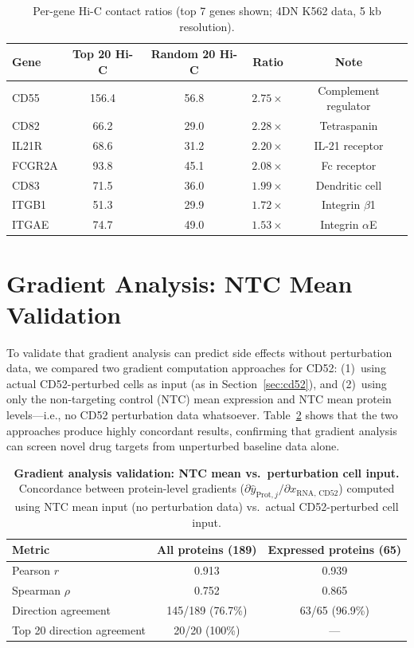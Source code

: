 \documentclass{article}
\begin{document}
\begin{table}[H]
\centering
\small
\caption{Per-gene Hi-C contact ratios (top 7 genes shown; 4DN K562 data, 5 kb resolution).}
\begin{tabular}{lcccc}
\toprule
Gene & Top 20 Hi-C & Random 20 Hi-C & Ratio & Note \\
\midrule
CD55 & 156.4 & 56.8 & $2.75\times$ & Complement regulator \\
CD82 & 66.2 & 29.0 & $2.28\times$ & Tetraspanin \\
IL21R & 68.6 & 31.2 & $2.20\times$ & IL-21 receptor \\
FCGR2A & 93.8 & 45.1 & $2.08\times$ & Fc receptor \\
CD83 & 71.5 & 36.0 & $1.99\times$ & Dendritic cell \\
ITGB1 & 51.3 & 29.9 & $1.72\times$ & Integrin $\beta$1 \\
ITGAE & 74.7 & 49.0 & $1.53\times$ & Integrin $\alpha$E \\
\bottomrule
\end{tabular}
\label{tab:hic_full}
\end{table}

\section{Gradient Analysis: NTC Mean Validation}
\label{app:ntc_gradient}

To validate that gradient analysis can predict side effects without perturbation data, we compared two gradient computation approaches for CD52: (1)~using actual CD52-perturbed cells as input (as in Section~\ref{sec:cd52}), and (2)~using only the non-targeting control (NTC) mean expression and NTC mean protein levels---i.e., no CD52 perturbation data whatsoever. Table~\ref{tab:ntc_validation} shows that the two approaches produce highly concordant results, confirming that gradient analysis can screen novel drug targets from unperturbed baseline data alone.

\begin{table}[H]
\centering
\caption{\textbf{Gradient analysis validation: NTC mean vs.\ perturbation cell input.} Concordance between protein-level gradients ($\partial \hat{y}_{\text{Prot},j} / \partial x_{\text{RNA, CD52}}$) computed using NTC mean input (no perturbation data) vs.\ actual CD52-perturbed cell input.}
\label{tab:ntc_validation}
\begin{tabular}{lcc}
\toprule
Metric & All proteins (189) & Expressed proteins (65) \\
\midrule
Pearson $r$ & 0.913 & 0.939 \\
Spearman $\rho$ & 0.752 & 0.865 \\
Direction agreement & 145/189 (76.7\%) & 63/65 (96.9\%) \\
Top 20 direction agreement & 20/20 (100\%) & --- \\
\bottomrule
\end{tabular}
\end{table}
\end{document}
